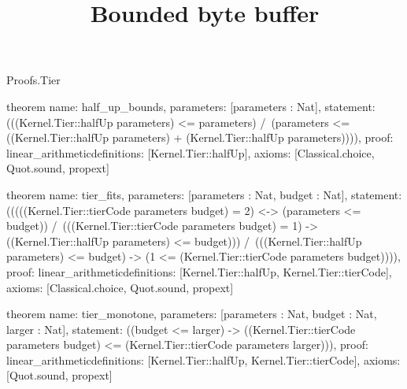 \begin{lexlean}{Proofs.Tier}
\title{Bounded byte buffer}
\begin{semanticmodule}
theorem{
  name: half_up_bounds,
  parameters: [parameters : Nat],
  statement: (((Kernel.Tier::halfUp parameters) <= parameters) /\ (parameters <= ((Kernel.Tier::halfUp parameters) + (Kernel.Tier::halfUp parameters)))),
  proof: linear_arithmetic{definitions: [Kernel.Tier::halfUp]},
  axioms: [Classical.choice, Quot.sound, propext]
}

theorem{
  name: tier_fits,
  parameters: [parameters : Nat, budget : Nat],
  statement: (((((Kernel.Tier::tierCode parameters budget) = 2) <-> (parameters <= budget)) /\ (((Kernel.Tier::tierCode parameters budget) = 1) -> ((Kernel.Tier::halfUp parameters) <= budget))) /\ (((Kernel.Tier::halfUp parameters) <= budget) -> (1 <= (Kernel.Tier::tierCode parameters budget)))),
  proof: linear_arithmetic{definitions: [Kernel.Tier::halfUp, Kernel.Tier::tierCode]},
  axioms: [Classical.choice, Quot.sound, propext]
}

theorem{
  name: tier_monotone,
  parameters: [parameters : Nat, budget : Nat, larger : Nat],
  statement: ((budget <= larger) -> ((Kernel.Tier::tierCode parameters budget) <= (Kernel.Tier::tierCode parameters larger))),
  proof: linear_arithmetic{definitions: [Kernel.Tier::halfUp, Kernel.Tier::tierCode]},
  axioms: [Quot.sound, propext]
}
\end{semanticmodule}
\end{lexlean}
